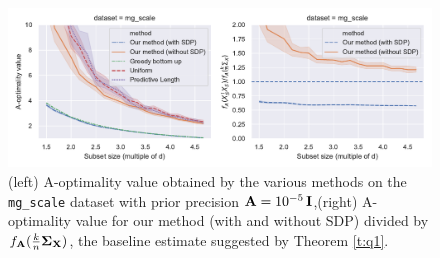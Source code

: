 \begin{figure}
    \centering
    \hspace{-0.35cm}
    \includegraphics[width=\textwidth]{Figures/mg_combined.pdf}
    \caption{(left) A-optimality value obtained by the various methods on
        the \texttt{mg\_scale} dataset \citep{libsvm} with
        prior precision $\mathbf A = 10^{-5}\, \mathbf I$,\quad (right)
A-optimality value for our method (with and without SDP) divided by
$f_{\mathbf A}(\frac kn\mathbf{\Sigma}_{\mathbf X})$, the baseline estimate suggested by Theorem \ref{t:q1}.}
    \label{f:experiments}
\end{figure}

